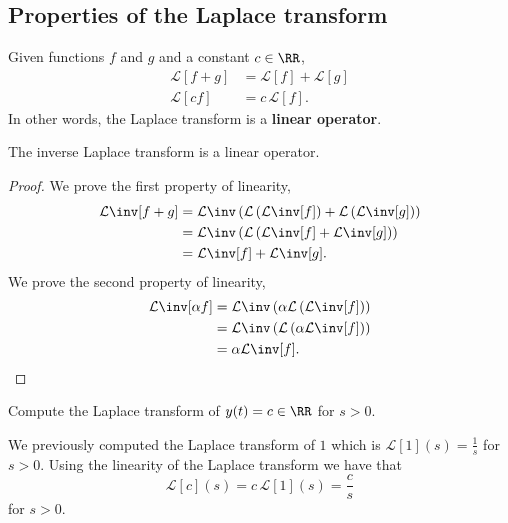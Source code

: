 \documentclass[12pt, a4paper]{article}
\newcommand{\CL}{\mathcal{L}}
\begin{document}
\subsection{Properties of the Laplace transform}

\begin{theorem}
    Given functions \(f\) and \(g\) and a constant \(c \in \RR\),
    \[\begin{aligned}
        \CL[f+g] &= \CL[f]+\CL[g] \\
        \CL[cf] &= c \, \CL[f].
    \end{aligned}\]
    In other words, the Laplace transform is a \textbf{linear operator}.
\end{theorem}

\begin{theorem}
    The inverse Laplace transform is a linear operator.
\end{theorem}

\begin{proof}
    We prove the first property of linearity, 
    \[\begin{aligned}
        \CL\inv [f+g] &= \CL\inv \left( \CL \left( \CL\inv[f] \right) +\CL \left( \CL\inv[g] \right) \right)\\
        &= \CL\inv \left( \CL \left( \CL\inv[f]+\CL\inv[g] \right) \right) \\
        &= \CL\inv[f] +\CL\inv[g].
    \end{aligned}\]
    We prove the second property of linearity,
    \[\begin{aligned}
        \CL\inv[\alpha f ] &= \CL\inv \left( \alpha \CL\left( \CL\inv[f] \right) \right) \\
        &= \CL\inv\left( \CL\left( \alpha \CL\inv[f] \right) \right) \\
        &= \alpha\CL\inv[f].
    \end{aligned}\]
\end{proof}

\begin{example}
    Compute the Laplace transform of \(y(t)=c \in \RR\) for \(s >0\).
    \begin{solution}
        We previously computed the Laplace transform of \(1\) which is \(\CL[1](s)=\frac{1}{s}\) for \(s >0\). Using the linearity of the Laplace transform we have that 
        \[\CL[c](s) = c \, \CL[1](s) = \frac{c}{s}\]
        for \(s >0\).
    \end{solution}
\end{example}
\end{document}
